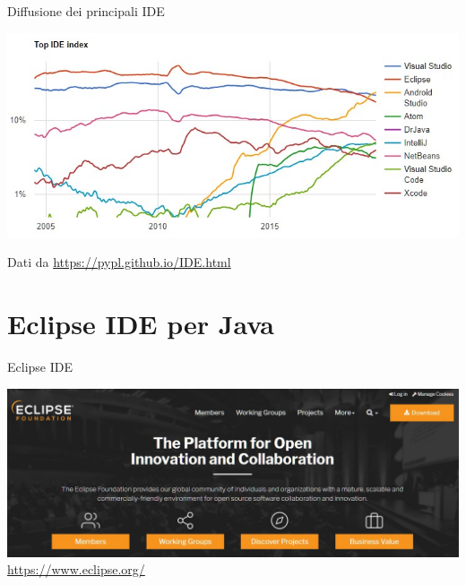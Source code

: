 \documentclass[presentation]{beamer}
\begin{document}
\begin{frame}{Diffusione dei principali IDE}
	\begin{center}
		\includegraphics[width=\textwidth]{img/ide2019.png}
	\end{center}
	\centering
	Dati da \url{https://pypl.github.io/IDE.html}
\end{frame}

\section{Eclipse IDE per Java}

\begin{frame}{Eclipse IDE}
\begin{center}
\includegraphics[width=\textwidth]{img/eclipse-web-site.png}
\url{https://www.eclipse.org/}
\end{center}
\end{frame}
\end{document}
